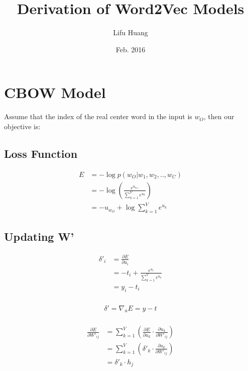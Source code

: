 \documentclass{article}
\title{Derivation of Word2Vec Models}
\author{Lifu Huang}
\date{Feb. 2016}
\begin{document}
	\maketitle
	\section{CBOW Model}
	Assume that the index of the real center word in the input is $w_O$, then our objective is:
	\subsection{Loss Function}
	\begin{equation}
		\begin{aligned}
			E &=-\log  p(w_{O}|w_{1}, w_{2}, .., w_{C})\\ 
			&=-\log  \left( \frac { e^{ u_{w_{O}} } }{ \sum _{ k=1 }^{ V } e^{ u_{ k } } }  \right) \\ 
			&=-u_{w_{O}}+\log { \sum _{ k=1 }^{ V } e^{ u_{ k } } } 
		\end{aligned}
	\end{equation}
	\subsection{Updating W'}
	\begin{equation}
		\begin{aligned}
			\delta'_i &= \frac{\partial E}{\partial u_{i}} \\
			&= -t_i + \frac{e^{u_i}}{\sum_{k=1}^{V}e^{u_{k}}} \\
			&= y_i - t_i \\
		\end{aligned}
	\end{equation}

	\begin{equation}
		\begin{aligned}
			\delta' = \nabla_u E = y - t \\		
		\end{aligned}
	\end{equation}
	
	\begin{equation}
		\begin{aligned}
			\frac{\partial E}{\partial W'_{ij}} &= \sum_{k=1}^{V} \left( \frac{\partial E}{\partial u_k} \cdot \frac{\partial u_k}{\partial W'_{ij}} \right) \\
			&= \sum_{k=1}^{V} \left(\delta'_k \cdot \frac{\partial u_k}{\partial W'_{ij}}\right)  \\
			&= \delta'_k \cdot h_j \\
		\end{aligned}
	\end{equation}	
\end{document}
